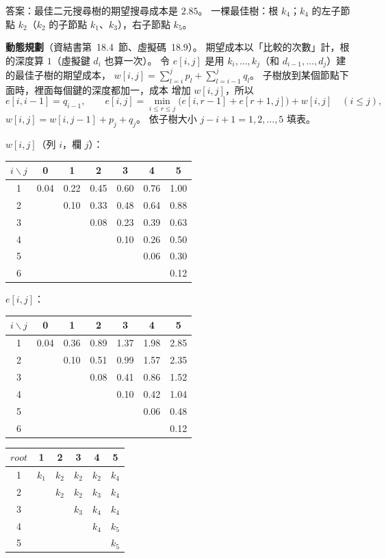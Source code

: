 \begin{pastsoln}
答案：最佳二元搜尋樹的期望搜尋成本是 $2.85$。 一棵最佳樹：根 $k_4$；$k_4$ 的左子節點 $k_2$（$k_2$ 的子節點
$k_1$、$k_3$），右子節點 $k_5$。

\textbf{動態規劃}（資結書第~18.4~節、虛擬碼~18.9）。 期望成本以「比較的次數」計，根的深度算 $1$（虛擬鍵
$d_i$ 也算一次）。 令 $e[i, j]$ 是用 $k_i, \ldots, k_j$（和 $d_{i-1}, \ldots, d_j$）建的最佳子樹的期望成本，
$w[i, j] = \sum_{l=i}^{j} p_l + \sum_{l=i-1}^{j} q_l$。 子樹放到某個節點下面時，裡面每個鍵的深度都加一，成本
增加 $w[i, j]$，所以
\[
e[i, i-1] = q_{i-1}, \qquad
e[i, j] = \min_{i \le r \le j}\bigl( e[i, r-1] + e[r+1, j] \bigr) + w[i, j] \quad (i \le j),
\]
$w[i, j] = w[i, j-1] + p_j + q_j$。 依子樹大小 $j - i + 1 = 1, 2, \ldots, 5$ 填表。

$w[i, j]$（列 $i$，欄 $j$）：
\begin{center}
\small
\begin{tabular}{c|cccccc}
$i \backslash j$ & 0 & 1 & 2 & 3 & 4 & 5 \\ \hline
1 & 0.04 & 0.22 & 0.45 & 0.60 & 0.76 & 1.00 \\
2 &  & 0.10 & 0.33 & 0.48 & 0.64 & 0.88 \\
3 &  &  & 0.08 & 0.23 & 0.39 & 0.63 \\
4 &  &  &  & 0.10 & 0.26 & 0.50 \\
5 &  &  &  &  & 0.06 & 0.30 \\
6 &  &  &  &  &  & 0.12 \\
\end{tabular}
\end{center}
$e[i, j]$：
\begin{center}
\small
\begin{tabular}{c|cccccc}
$i \backslash j$ & 0 & 1 & 2 & 3 & 4 & 5 \\ \hline
1 & 0.04 & 0.36 & 0.89 & 1.37 & 1.98 & 2.85 \\
2 &  & 0.10 & 0.51 & 0.99 & 1.57 & 2.35 \\
3 &  &  & 0.08 & 0.41 & 0.86 & 1.52 \\
4 &  &  &  & 0.10 & 0.42 & 1.04 \\
5 &  &  &  &  & 0.06 & 0.48 \\
6 &  &  &  &  &  & 0.12 \\
\end{tabular}
\qquad
\begin{tabular}{c|ccccc}
$\mathit{root}$ & 1 & 2 & 3 & 4 & 5 \\ \hline
1 & $k_1$ & $k_2$ & $k_2$ & $k_2$ & $k_4$ \\
2 &  & $k_2$ & $k_2$ & $k_3$ & $k_4$ \\
3 &  &  & $k_3$ & $k_4$ & $k_4$ \\
4 &  &  &  & $k_4$ & $k_5$ \\
5 &  &  &  &  & $k_5$ \\
\end{tabular}
\end{center}


\end{pastsoln}
